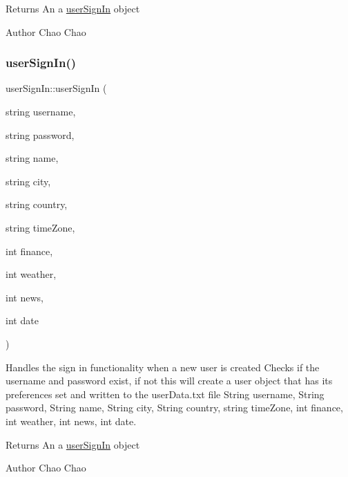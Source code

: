 \begin{DoxyReturn}{Returns}
An a \mbox{\hyperlink{classuser_sign_in}{user\+Sign\+In}} object 
\end{DoxyReturn}
\begin{DoxyAuthor}{Author}
Chao Chao 
\end{DoxyAuthor}
\mbox{\label{classuser_sign_in_a179a4991b9e103b2fb422f25f520fe1b}} 
\subsubsection{\texorpdfstring{user\+Sign\+In()}{userSignIn()}\hspace{0.1cm}{\footnotesize\ttfamily [3/3]}}
{\footnotesize\ttfamily user\+Sign\+In\+::user\+Sign\+In (\begin{DoxyParamCaption}\item[{string}]{username,  }\item[{string}]{password,  }\item[{string}]{name,  }\item[{string}]{city,  }\item[{string}]{country,  }\item[{string}]{time\+Zone,  }\item[{int}]{finance,  }\item[{int}]{weather,  }\item[{int}]{news,  }\item[{int}]{date }\end{DoxyParamCaption})}



Handles the sign in functionality when a new user is created  Checks if the username and password exist, if not this will create a user object that has its preferences set and written to the user\+Data.\+txt file  String username, String password, String name, String city, String country, string time\+Zone, int finance, int weather, int news, int date. 

\begin{DoxyReturn}{Returns}
An a \mbox{\hyperlink{classuser_sign_in}{user\+Sign\+In}} object 
\end{DoxyReturn}
\begin{DoxyAuthor}{Author}
Chao Chao 
\end{DoxyAuthor}
\mbox{\label{classuser_sign_in_a3a005bfb5efd54a7b9785fc39492ae4d}} 
